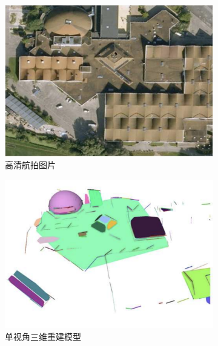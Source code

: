 \documentclass[bachelor, nocolorlinks, printoneside]{seuthesis} %
\begin{document}
\begin{Main}
\begin{figure}
	\begin{subfigure}[t]{0.30\linewidth} \centering 
        \includegraphics[width=\columnwidth]{figs/app/image.png}
        \caption{高清航拍图片}\label{fig:civil-plane-image}
    \end{subfigure}
    \begin{subfigure}[t]{0.30\linewidth} \centering
        \includegraphics[width=\columnwidth]{figs/app/recon.png}
        \caption{单视角三维重建模型}\label{fig:civil-recon}
    \end{subfigure}
    \begin{subfigure}[t]{0.30\linewidth} \centering

\end{subfigure}
\end{figure}
\end{Main}
\end{document}
